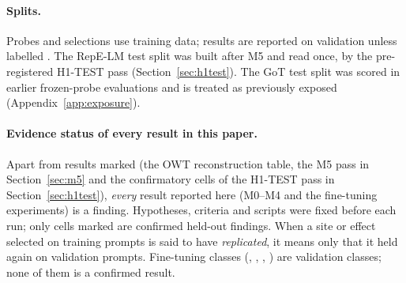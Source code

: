 \paragraph{Splits.} Probes and selections use training data; results are reported on validation unless labelled
. The RepE-LM test split was built after M5 and read once, by the pre-registered H1-TEST pass
(Section~\ref{sec:h1test}). The GoT test split was scored in earlier
frozen-probe evaluations and is treated as previously exposed (Appendix~\ref{app:exposure}).

\paragraph{Evidence status of every result in this paper.} Apart from results marked  (the OWT
reconstruction table, the M5 pass in Section~\ref{sec:m5} and the confirmatory cells of the H1-TEST pass in
Section~\ref{sec:h1test}), \emph{every} result reported here (M0--M4 and the fine-tuning experiments) is a
 finding. Hypotheses, criteria and scripts were fixed before each run; only cells marked
 are confirmed held-out findings. When a site or effect selected on training prompts
is said to have \emph{replicated}, it means only that it held again on validation prompts. Fine-tuning
classes (, , ,
) are validation classes; none of them is a confirmed result.



